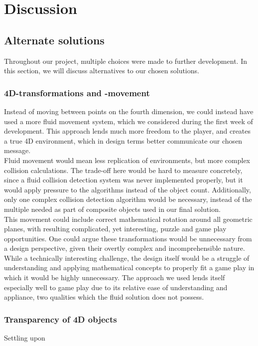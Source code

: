 \section{Discussion}
\subsection{Alternate solutions}
Throughout our project, multiple choices were made to further development. In this section, we will discuss alternatives to our chosen solutions.

\subsubsection{4D-transformations and -movement}
Instead of moving between points on the fourth dimension, we could instead have used a more fluid movement system, which we considered during the first week of development. This approach lends much more freedom to the player, and creates a true 4D environment, which in design terms better communicate our chosen message.\\

Fluid movement would mean less replication of environments, but more complex collision calculations. The trade-off here would be hard to measure concretely, since a fluid collision detection system was never implemented properly, but it would apply pressure to the algorithms instead of the object count. Additionally, only one complex collision detection algorithm would be necessary, instead of the multiple needed as part of composite objects used in our final solution.\\

This movement could include correct mathematical rotation around all geometric planes, with resulting complicated, yet interesting, puzzle and game play opportunities. One could argue these transformations would be unnecessary from a design perspective, given their overtly complex and incomprehensible nature.\\

While a technically interesting challenge, the design itself would be a struggle of understanding and applying mathematical concepts to properly fit a game play in which it would be highly unnecessary. The approach we used lends itself especially well to game play due to its relative ease of understanding and appliance, two qualities which the fluid solution does not possess.

\subsubsection{Transparency of 4D objects}
Settling upon 